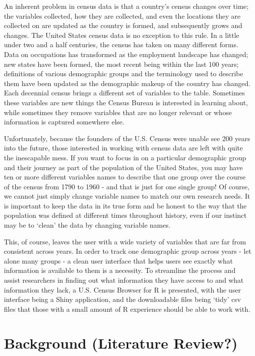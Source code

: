 \documentclass[11pt,]{article}
\begin{document}
An inherent problem in census data is that a country's census changes
over time; the variables collected, how they are collected, and even the
locations they are collected on are updated as the country is formed,
and subsequently grows and changes. The United States census data is no
exception to this rule. In a little under two and a half centuries, the
census has taken on many different forms. Data on occupations has
transformed as the employment landscape has changed; new states have
been formed, the most recent being within the last 100 years;
definitions of various demographic groups and the terminology used to
describe them have been updated as the demographic makeup of the country
has changed. Each decennial census brings a different set of variables
to the table. Sometimes these variables are new things the Census Bureau
is interested in learning about, while sometimes they remove variables
that are no longer relevant or whose information is captured somewhere
else.

Unfortunately, because the founders of the U.S. Census were unable see
200 years into the future, those interested in working with census data
are left with quite the inescapable mess. If you want to focus in on a
particular demographic group and their journey as part of the population
of the United States, you may have ten or more different variables names
to describe that one group over the course of the census from 1790 to
1960 - and that is just for one single group! Of course, we cannot just
simply change variable names to match our own research needs. It is
important to keep the data in its true form and be honest to the way
that the population was defined at different times throughout history,
even if our instinct may be to `clean' the data by changing variable
names.

This, of course, leaves the user with a wide variety of variables that
are far from consistent across years. In order to track one demographic
group across years - let alone many groups - a clean user interface that
helps users see exactly what information is available to them is a
necessity. To streamline the process and assist researchers in finding
out what information they have access to and what information they lack,
a U.S. Census Browser for R is presented, with the user interface being
a Shiny application, and the downloadable files being `tidy' csv files
that those with a small amount of R experience should be able to work
with.

\section{Background (Literature Review?)}
\end{document}
